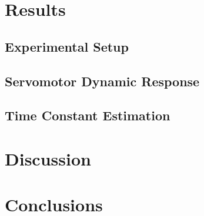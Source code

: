 \documentclass[lettersize,journal]{IEEEtran}
\begin{document}
	
	\section{Results}
	\label{sec:results}
	
	\subsection{Experimental Setup}
	
	\subsection{Servomotor Dynamic Response}
	
	\subsection{Time Constant Estimation}


	\section{Discussion}
	\label{sec:discussion}
	
	\section{Conclusions}
	\label{sec:conclusions}
	
	
	
	\balance
	
	
	
	
\end{document}
